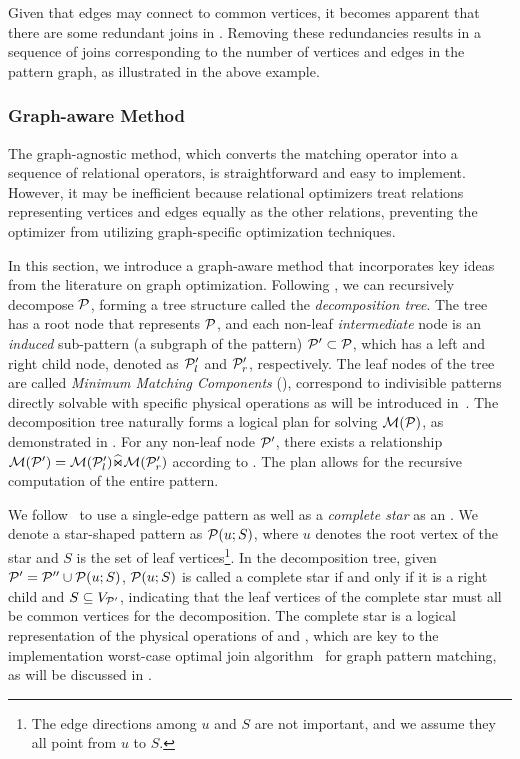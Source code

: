 Given that edges may connect to common vertices, it becomes apparent that there are some redundant joins in . Removing these redundancies results in a sequence of joins corresponding to the number of vertices and edges in the pattern graph, as illustrated in the above example.

\subsubsection{Graph-aware Method}
\label{sec:graph-aware}
The graph-agnostic method, which converts the matching operator into a sequence of relational operators, is straightforward and easy to implement. However, it may be inefficient because relational optimizers treat relations representing vertices and edges equally as the other relations, preventing the optimizer from utilizing graph-specific optimization techniques. %

In this section, we introduce a graph-aware method that incorporates key ideas from the literature on graph optimization. Following , we can recursively decompose $\mathcal{P}$, forming a tree structure called the \emph{decomposition tree}. The tree has a root node that represents $\mathcal{P}$, and each non-leaf \emph{intermediate} node is an \emph{induced} sub-pattern (a subgraph of the pattern) $\mathcal{P}' \subset \mathcal{P}$, which has a left and right child node, denoted as $\mathcal{P}'_l$ and $\mathcal{P}'_r$, respectively. %
The leaf nodes of the tree are called \emph{Minimum Matching Components} (\mmc), correspond to indivisible patterns directly solvable with specific physical operations
as will be introduced in~. The decomposition tree naturally forms a logical plan for solving $\mathcal{M}(\mathcal{P})$, as demonstrated in . For any non-leaf node $\mathcal{P}'$, there exists a relationship $\mathcal{M}(\mathcal{P}') = \mathcal{M}(\mathcal{P}'_l) \widehat{\Join} \mathcal{M}(\mathcal{P}'_r)$ according to . The plan allows for the recursive computation of the entire pattern.

We follow~\cite{huge} to use a single-edge pattern as well as a \emph{complete star} as an \mmc. We denote a star-shaped pattern as $\mathcal{P}(u;S)$, where $u$ denotes the root vertex of the star and $S$ is the set of leaf vertices\footnote{The edge directions among $u$ and $S$ are not important, and we assume they  all point from $u$ to $S$.}.
In the decomposition tree, given $\mathcal{P}' = \mathcal{P}'' \cup \mathcal{P}(u;S)$, $\mathcal{P}(u;S)$ is called a complete star if and only if it is a right child and $S \subseteq V_{\mathcal{P}'}$, indicating that the leaf vertices of the complete star must all be common vertices for the decomposition. The complete star is a logical representation of the physical operations of \expand and \intersection, which are key to the implementation worst-case optimal join algorithm~\cite{mhedhbi2019optimizing} for graph pattern matching, as will be discussed in .

